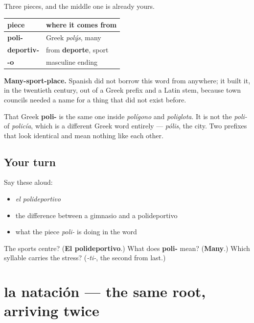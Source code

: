 \begin{cousinweb}
Three pieces, and the middle one is already yours.

\noindent
\begin{tabularx}{\linewidth}{@{}>{\raggedright\arraybackslash}X>{\raggedright\arraybackslash}X@{}}
\toprule
\textbf{piece} & \textbf{where it comes from} \\
\midrule
\textbf{poli-} & Greek \emph{polýs}, many \\
\textbf{deportiv-} & from \textbf{deporte}, sport \\
\textbf{-o} & masculine ending \\
\bottomrule
\end{tabularx}

\textbf{Many-sport-place.} Spanish did not borrow this word from anywhere; it built it, in the twentieth century, out of a Greek prefix and a Latin stem, because town councils needed a name for a thing that did not exist before.

That Greek \textbf{poli-} is the same one inside \emph{polígono} and \emph{poliglota}. It is not the \emph{poli-} of \emph{policía}, which is a different Greek word entirely — \emph{pólis}, the city. Two prefixes that look identical and mean nothing like each other.
\end{cousinweb}

\subsection*{Your turn}
Say these aloud:

\begin{itemize}
\raggedright
  \item \emph{el polideportivo}
  \item the difference between a gimnasio and a polideportivo
  \item what the piece \emph{poli-} is doing in the word
\end{itemize}

\begin{tcolorbox}[breakable,colback=teal!4,colframe=teal!35!black,title={Before you move on}]
The sports centre? (\textbf{El polideportivo}.) What does \textbf{poli-} mean? (\textbf{Many}.) Which syllable carries the stress? (\emph{-ti-}, the second from last.)
\end{tcolorbox}
\section[la natación]{la natación — the same root, arriving twice}

